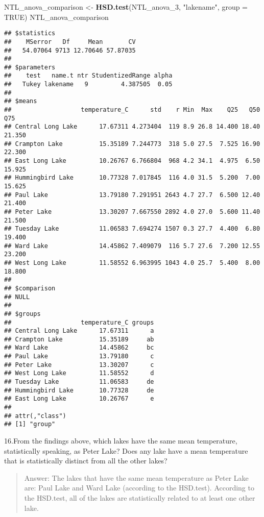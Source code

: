 \documentclass[
]{article}
\newenvironment{Shaded}{\begin{snugshade}}{\end{snugshade}}
\newcommand{\DataTypeTok}[1]{\textcolor[rgb]{0.13,0.29,0.53}{#1}}
\newcommand{\DecValTok}[1]{\textcolor[rgb]{0.00,0.00,0.81}{#1}}
\newcommand{\KeywordTok}[1]{\textcolor[rgb]{0.13,0.29,0.53}{\textbf{#1}}}
\newcommand{\NormalTok}[1]{#1}
\newcommand{\OtherTok}[1]{\textcolor[rgb]{0.56,0.35,0.01}{#1}}
\newcommand{\StringTok}[1]{\textcolor[rgb]{0.31,0.60,0.02}{#1}}
\begin{document}
\begin{Shaded}
\begin{Highlighting}[]
\NormalTok{NTL_anova_comparison <-}\StringTok{ }\KeywordTok{HSD.test}\NormalTok{(NTL_anova_}\DecValTok{3}\NormalTok{, }\StringTok{"lakename"}\NormalTok{, }\DataTypeTok{group =} \OtherTok{TRUE}\NormalTok{)}
\NormalTok{NTL_anova_comparison}
\end{Highlighting}
\end{Shaded}

\begin{verbatim}
## $statistics
##    MSerror   Df     Mean       CV
##   54.07064 9713 12.70646 57.87035
## 
## $parameters
##    test   name.t ntr StudentizedRange alpha
##   Tukey lakename   9         4.387505  0.05
## 
## $means
##                   temperature_C      std    r Min  Max    Q25   Q50    Q75
## Central Long Lake      17.67311 4.273404  119 8.9 26.8 14.400 18.40 21.350
## Crampton Lake          15.35189 7.244773  318 5.0 27.5  7.525 16.90 22.300
## East Long Lake         10.26767 6.766804  968 4.2 34.1  4.975  6.50 15.925
## Hummingbird Lake       10.77328 7.017845  116 4.0 31.5  5.200  7.00 15.625
## Paul Lake              13.79180 7.291951 2643 4.7 27.7  6.500 12.40 21.400
## Peter Lake             13.30207 7.667550 2892 4.0 27.0  5.600 11.40 21.500
## Tuesday Lake           11.06583 7.694274 1507 0.3 27.7  4.400  6.80 19.400
## Ward Lake              14.45862 7.409079  116 5.7 27.6  7.200 12.55 23.200
## West Long Lake         11.58552 6.963995 1043 4.0 25.7  5.400  8.00 18.800
## 
## $comparison
## NULL
## 
## $groups
##                   temperature_C groups
## Central Long Lake      17.67311      a
## Crampton Lake          15.35189     ab
## Ward Lake              14.45862     bc
## Paul Lake              13.79180      c
## Peter Lake             13.30207      c
## West Long Lake         11.58552      d
## Tuesday Lake           11.06583     de
## Hummingbird Lake       10.77328     de
## East Long Lake         10.26767      e
## 
## attr(,"class")
## [1] "group"
\end{verbatim}

16.From the findings above, which lakes have the same mean temperature,
statistically speaking, as Peter Lake? Does any lake have a mean
temperature that is statistically distinct from all the other lakes?

\begin{quote}
Answer: The lakes that have the same mean temperature as Peter Lake are:
Paul Lake and Ward Lake (according to the HSD.test). According to the
HSD.test, all of the lakes are statistically related to at least one
other lake.
\end{quote}
\end{document}

